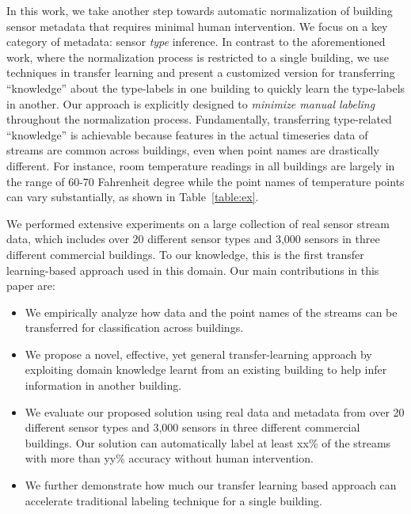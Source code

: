 In this work, we take another step towards automatic normalization of building 
sensor metadata that requires minimal human intervention. We focus on a key category 
of metadata: sensor {\it type} inference. In contrast to the aforementioned work, 
where the normalization process is restricted to a single building, 
we use techniques in transfer learning and present a customized version for transferring 
``knowledge'' about the type-labels in one building to quickly learn the type-labels in another.
Our approach is explicitly designed to \emph{minimize manual labeling} throughout the normalization process.
Fundamentally, transferring type-related ``knowledge'' is achievable because
features in the actual timeseries data of streams are common 
across buildings, even when point names are drastically different. For instance, room temperature 
readings in all buildings are largely in the range of 60-70 Fahrenheit degree while 
the point names of temperature points can vary substantially, as shown in
Table~\ref{table:ex}.

We performed extensive experiments on a large 
collection of real sensor stream data, which includes over 20 different sensor types 
and 3,000 sensors in three different commercial buildings. To our knowledge, this is the first 
transfer learning-based approach used in this domain.  Our main 
contributions in this paper are:

\begin{itemize}\itemsep1pt \parskip1pt 
\item We empirically analyze how data and the point names of the streams can be transferred for classification across buildings.
\item We propose a novel, effective, yet general transfer-learning approach by exploiting domain knowledge learnt from an existing building to help infer information in another building.
\item We evaluate our proposed solution using real data and metadata from over 20 different sensor types and 3,000 sensors in three different commercial buildings.  Our solution can automatically label at least xx\% of the streams with more than yy\% accuracy without human intervention.
\item We further demonstrate how much our transfer learning based approach can accelerate traditional labeling technique for a single building.
\end{itemize}
